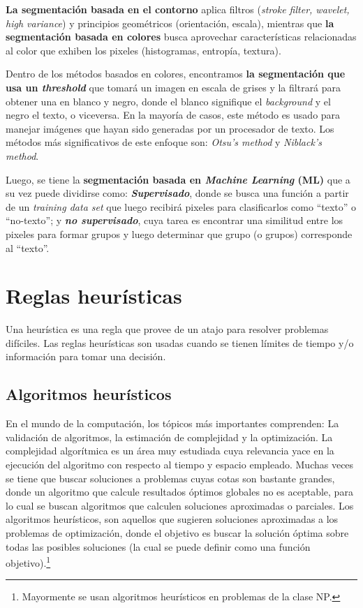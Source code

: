 \textbf{La segmentación basada en el contorno} aplica filtros (\textit{stroke
filter, wavelet, high variance}) y principios geométricos (orientación, 
escala), mientras que \textbf{la segmentación basada en colores} busca 
aprovechar características relacionadas al color que exhiben los pixeles
(histogramas, entropía, textura).

Dentro de los métodos basados en colores, encontramos \textbf{la segmentación
que usa un \textit{threshold}} que tomará un imagen en escala de grises y la
filtrará  para obtener una en blanco y negro, donde el blanco signifique el
\textit{background} y el negro el texto, o viceversa. En la mayoría de casos, 
este método es usado para manejar imágenes que hayan sido generadas por un 
procesador de texto. Los métodos más significativos de este enfoque son: 
\textit{Otsu's method} y \textit{Niblack's method}.\cite{Sezgin:2004:Survey}

Luego, se tiene la \textbf{segmentación basada en \textit{Machine Learning} 
(ML)} que a su vez puede dividirse como: \textbf{\textit{Supervisado}}, donde 
se busca una función a partir de un \textit{training data set} que luego 
recibirá pixeles para clasificarlos como ``texto'' o ``no-texto''; y
\textbf{\textit{no supervisado}}, cuya tarea es encontrar una similitud entre
los pixeles para formar grupos y luego determinar que grupo (o grupos) 
corresponde al ``texto''.

\section{Reglas heurísticas}
\label{sec:heuristicas}
Una heurística es una regla que provee de un atajo para resolver problemas 
difíciles. Las reglas heurísticas son usadas cuando se tienen límites de
tiempo y/o información para tomar una decisión.
\subsection{Algoritmos heurísticos}
  En el mundo de la computación, los tópicos más importantes comprenden: La 
  validación de algoritmos, la estimación de complejidad y la optimización. La
  complejidad algorítmica es un área muy estudiada cuya relevancia yace en la 
  ejecución del algoritmo con respecto al tiempo y espacio empleado. Muchas 
  veces se tiene que buscar soluciones a problemas cuyas cotas son bastante 
  grandes, donde un algoritmo que calcule resultados óptimos globales no es 
  aceptable, para lo cual se buscan algoritmos que calculen soluciones 
  aproximadas o parciales. Los algoritmos heurísticos, son aquellos que 
  sugieren soluciones aproximadas a los problemas de optimización, donde el
  objetivo es buscar la solución óptima sobre todas las posibles soluciones 
  (la cual se puede definir como una función objetivo).\footnote{Mayormente se
  usan algoritmos heurísticos en problemas de la clase NP.}
